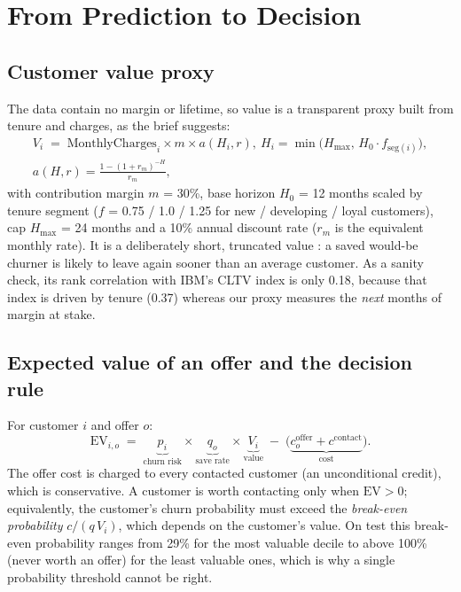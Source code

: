 \documentclass[11pt,a4paper]{article}
\begin{document}
\section{From Prediction to Decision}

\subsection{Customer value proxy}

The data contain no margin or lifetime, so value is a transparent proxy built from tenure and charges, as the brief suggests:
\begin{gather*}
V_i \;=\; \text{MonthlyCharges}_i \times m \times a\!\left(H_i, r\right),\
H_i = \min\!\big(H_{\max},\, H_0 \cdot f_{\text{seg}(i)}\big),\\
a(H,r) = \frac{1-(1+r_m)^{-H}}{r_m},
\end{gather*}
with contribution margin $m$ = 30\%, base horizon $H_0$ = 12 months scaled by tenure segment ($f$ = 0.75 / 1.0 / 1.25 for new / developing / loyal customers), cap $H_{\max}$ = 24 months and a 10\% annual discount rate ($r_m$ is the equivalent monthly rate). It is a deliberately short, truncated value \cite{faderhardie2014,gupta2004}: a saved would-be churner is likely to leave again sooner than an average customer. As a sanity check, its rank correlation with IBM's CLTV index is only 0.18, because that index is driven by tenure (0.37) whereas our proxy measures the \emph{next} months of margin at stake.

\subsection{Expected value of an offer and the decision rule}

For customer $i$ and offer $o$:
\[
\text{EV}_{i,o} \;=\; \underbrace{p_i}_{\text{churn risk}} \times \underbrace{q_o}_{\text{save rate}} \times \underbrace{V_i}_{\text{value}} \;-\; \big(\underbrace{c^{\text{offer}}_o + c^{\text{contact}}}_{\text{cost}}\big).
\]
The offer cost is charged to every contacted customer (an unconditional credit), which is conservative. A customer is worth contacting only when $\text{EV} > 0$; equivalently, the customer's churn probability must exceed the \emph{break-even probability} $c/(q\,V_i)$, which depends on the customer's value. On test this break-even probability ranges from 29\% for the most valuable decile to above 100\% (never worth an offer) for the least valuable ones, which is why a single probability threshold cannot be right.
\end{document}
